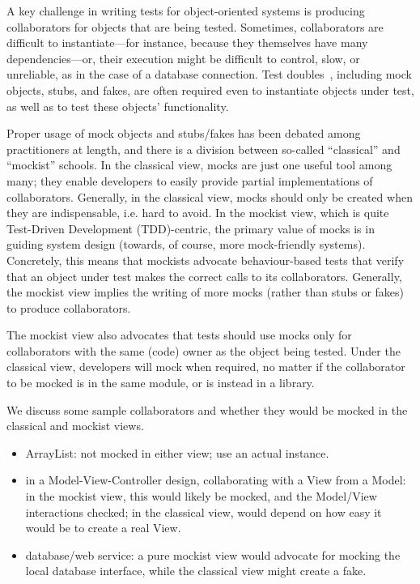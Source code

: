 A key challenge in writing tests for object-oriented systems is
producing collaborators for objects that are being tested. Sometimes,
collaborators are difficult to instantiate---for instance, because
they themselves have many dependencies---or, their execution might be
difficult to control, slow, or unreliable, as in the case of a
database connection.  Test doubles~\cite{meszaros2007xunit}, including
mock objects, stubs, and fakes, are often required even to instantiate
objects under test, as well as to test these objects' functionality.

Proper usage of mock objects and stubs/fakes has been debated among
practitioners at length, and there is a division between so-called
``classical'' and ``mockist'' schools. In the classical view, mocks
are just one useful tool among many; they enable developers to easily
provide partial implementations of collaborators. Generally, in the classical
view, mocks should only be created when they are indispensable, i.e. hard to avoid. In the mockist view,
which is quite Test-Driven Development (TDD)-centric, the primary value
of mocks is in guiding system design (towards, of course, more mock-friendly
systems). Concretely, this means that mockists advocate behaviour-based
tests that verify that an object under test makes the correct calls
to its collaborators. Generally, the mockist view implies the writing of more mocks
(rather than stubs or fakes) to produce collaborators.

The mockist view also advocates that tests should use mocks
only for collaborators with the same (code) owner as the object
being tested. Under the classical view, developers will mock
when required, no matter if the collaborator to be mocked is in
the same module, or is instead in a library.

We discuss some sample collaborators and whether they would be mocked in the 
classical and mockist views.

\begin{itemize}
\item ArrayList: not mocked in either view; use an actual instance.
\item in a Model-View-Controller design, collaborating with a View from a Model: in the mockist view,
this would likely be mocked, and the Model/View interactions checked; in the classical view, would depend on
how easy it would be to create a real View.
\item database/web service: a pure mockist view would advocate for mocking the local database interface, while the classical
view might create a fake.
\end{itemize}


